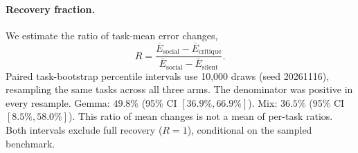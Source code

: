 \paragraph{Recovery fraction.} We estimate the ratio of task-mean error changes,
\[R=\frac{\overline E_{\mathrm{social}}-\overline E_{\mathrm{critique}}}{\overline E_{\mathrm{social}}-\overline E_{\mathrm{silent}}}.\]
Paired task-bootstrap percentile intervals use 10,000 draws (seed 20261116), resampling the same tasks across all three arms. The denominator was positive in every resample.
Gemma: $49.8\%$ (95\% CI $[36.9\%,66.9\%]$).
Mix: $36.5\%$ (95\% CI $[8.5\%,58.0\%]$).
This ratio of mean changes is not a mean of per-task ratios. Both intervals exclude full recovery ($R=1$), conditional on the sampled benchmark.
